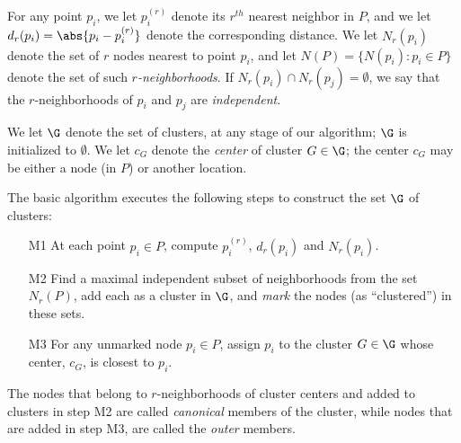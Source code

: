For any point $p_i$, we let $p_i^{(r)}$ denote its $r^{th}$ nearest neighbor in $P$, and we let $d_{r}(p_{i}) = \abs{p_{i} - p_{i}^{(r)}}$ denote the corresponding distance. We let $N_{r}(p_{i})$ denote the set of $r$ nodes nearest to point $p_i$, and let $N(P)=\{N(p_{i}): p_{i}\in P\}$ denote the set of such {\em $r$-neighborhoods}. If $N_{r}(p_{i}) \cap N_{r}(p_{j})=\emptyset$, we say that the $r$-neighborhoods of $p_{i}$ and $p_{j}$ are {\em independent}.


We let $\G$ denote the set of clusters, at any stage of our algorithm; $\G$ is initialized to $\emptyset$. 
We let $c_G$ denote the {\em center} of cluster $G\in \G$; the center $c_G$ may be either a node (in $P$) or another location.

The basic algorithm executes the following steps to construct the set $\G$ of clusters:
\begin{enumerate}
\item[M1] At each point $p_{i}\in P$, compute $p_{i}^{(r)}$, $d_{r}(p_{i})$ and $N_{r}(p_{i})$.
\item[M2] Find a maximal independent subset of neighborhoods from the set $N_{r}(P)$, add each as a cluster in $\G$, and {\em mark} the nodes (as ``clustered'') in these sets.
\item[M3]  For any unmarked node $p_{i}\in P$, assign $p_{i}$ to the cluster $G\in\G$ whose center, $c_G$, is closest to $p_{i}$.
\end{enumerate}

The nodes that belong to $r$-neighborhoods of cluster centers and added to clusters in step M2 are called {\em canonical} members of the cluster, while nodes that are added in step M3, are called the {\em outer} members. 



